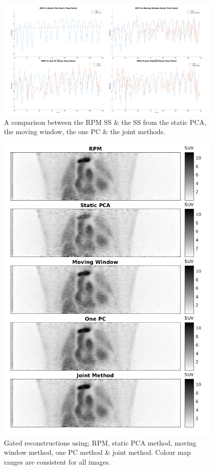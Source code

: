     \begin{figure}
        \centering
        \includegraphics[width=1.0\linewidth]{figures/surrogate_signal.png}
        \captionsetup{singlelinecheck=false, justification=centering}
        \caption{A comparison between the \gls{RPM} \gls{SS} \& the \gls{SS} from the static \gls{PCA}, the moving window, the one \gls{PC} \& the joint methods.}
        \label{fig:surrogate_signal}
    \end{figure}
    
    \begin{figure}
        \centering
        \includegraphics[width=0.75\linewidth]{figures/visual_analysis_pca.png}
        \captionsetup{singlelinecheck=false, justification=centering}
        \caption{Gated reconstructions using; \gls{RPM}, static \gls{PCA} method, moving window method, one \gls{PC} method \& joint method. Colour map ranges are consistent for all images.}
        \label{fig:visual_analysis}
    \end{figure}
    
